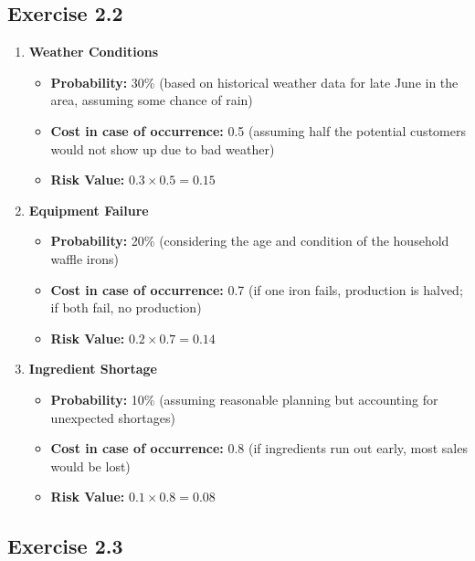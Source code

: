 \documentclass[a4paper]{scrartcl}
\begin{document}
\subsection*{Exercise 2.2}

\begin{enumerate}
    \item \textbf{Weather Conditions}
    \begin{itemize}
        \item \textbf{Probability:} 30\% (based on historical weather data for late June in the area, assuming some chance of rain)
        \item \textbf{Cost in case of occurrence:} 0.5 (assuming half the potential customers would not show up due to bad weather)
        \item \textbf{Risk Value:} $0.3 \times 0.5 = 0.15$
    \end{itemize}
    
    \item \textbf{Equipment Failure}
    \begin{itemize}
        \item \textbf{Probability:} 20\% (considering the age and condition of the household waffle irons)
        \item \textbf{Cost in case of occurrence:} 0.7 (if one iron fails, production is halved; if both fail, no production)
        \item \textbf{Risk Value:} $0.2 \times 0.7 = 0.14$
    \end{itemize}
    
    \item \textbf{Ingredient Shortage}
    \begin{itemize}
        \item \textbf{Probability:} 10\% (assuming reasonable planning but accounting for unexpected shortages)
        \item \textbf{Cost in case of occurrence:} 0.8 (if ingredients run out early, most sales would be lost)
        \item \textbf{Risk Value:} $0.1 \times 0.8 = 0.08$
    \end{itemize}
\end{enumerate}

\subsection*{Exercise 2.3}
\end{document}
